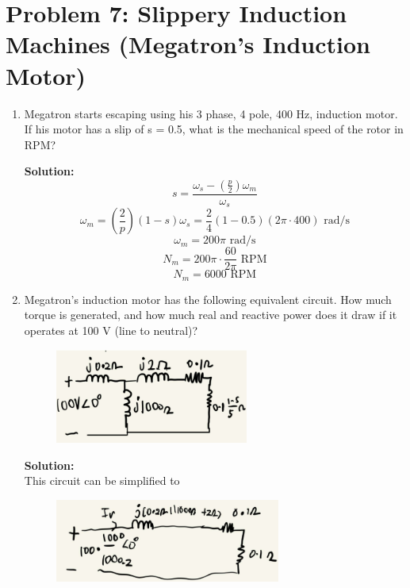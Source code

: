 \documentclass{article}
\begin{document}
\section*{Problem 7: Slippery Induction Machines (Megatron's Induction Motor)}  
\begin{enumerate}[label=(\alph*)]
    \item {Megatron starts escaping using his 3 phase, 4 pole, 400 Hz, induction motor.  If his motor has a slip of s = 0.5, what is the mechanical speed of the rotor in RPM?}

\textbf{Solution:}\\
$$s = \frac{\omega_s - \left(\frac{p}{2}\right)\omega_m}{\omega_s}$$
$$\omega_m = \left(\frac{2}{p}\right)(1-s)\omega_s = \frac{2}{4}(1-0.5)(2\pi \cdot 400) \text{ rad/s}$$
$$\omega_m = 200\pi \text{ rad/s}$$
$$N_m = 200\pi \cdot \frac{60}{2\pi} \text{ RPM}$$
$$\boxed{N_m = 6000 \text{ RPM}}$$
    \item {Megatron's induction motor has the following equivalent circuit. How much torque is generated, and how much real and reactive power does it draw if it operates at 100 V (line to neutral)?}
    \begin{figure}[H]
        \centering
        \includegraphics[width=0.6\textwidth]{figures/q7.PNG}
        \label{poletradsaj}
\end{figure}

\textbf{Solution:} \\
This circuit can be simplified to
\begin{figure}[!htb]
    \centering
    \includegraphics[width=0.7\textwidth]{figures/induction_sol.png}
\end{figure}


\end{enumerate}
\end{document}

